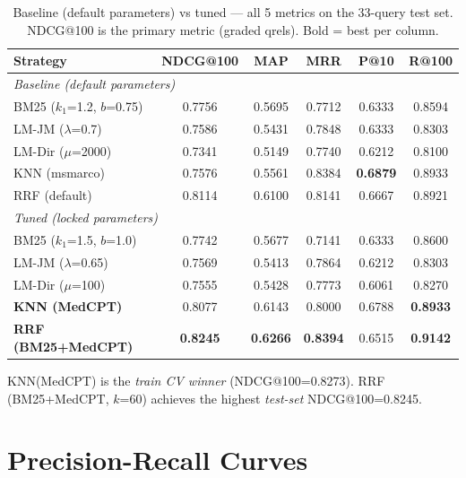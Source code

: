 \begin{table}[H]
\centering
\caption{Baseline (default parameters) vs tuned --- all 5 metrics on the
         33-query test set. NDCG@100 is the primary metric (graded qrels).
         Bold = best per column.}
\label{tab:test_results}
\begin{tabular}{lccccc}
  \hline
  \textbf{Strategy} & \textbf{NDCG@100} & \textbf{MAP} & \textbf{MRR}
                    & \textbf{P@10} & \textbf{R@100} \\
  \hline
  \multicolumn{6}{l}{\textit{Baseline (default parameters)}} \\
  BM25 ($k_1$=1.2, $b$=0.75)   & 0.7756 & 0.5695 & 0.7712 & 0.6333 & 0.8594 \\
  LM-JM ($\lambda$=0.7)         & 0.7586 & 0.5431 & 0.7848 & 0.6333 & 0.8303 \\
  LM-Dir ($\mu$=2000)           & 0.7341 & 0.5149 & 0.7740 & 0.6212 & 0.8100 \\
  KNN (msmarco)                 & 0.7576 & 0.5561 & 0.8384 & \textbf{0.6879} & 0.8933 \\
  RRF (default)                 & 0.8114 & 0.6100 & 0.8141 & 0.6667 & 0.8921 \\
  \hline
  \multicolumn{6}{l}{\textit{Tuned (locked parameters)}} \\
  BM25 ($k_1$=1.5, $b$=1.0)    & 0.7742 & 0.5677 & 0.7141 & 0.6333 & 0.8600 \\
  LM-JM ($\lambda$=0.65)        & 0.7569 & 0.5413 & 0.7864 & 0.6212 & 0.8303 \\
  LM-Dir ($\mu$=100)            & 0.7555 & 0.5428 & 0.7773 & 0.6061 & 0.8270 \\
  \textbf{KNN (MedCPT)}         & 0.8077 & 0.6143 & 0.8000 & 0.6788 & \textbf{0.8933} \\
  \textbf{RRF (BM25+MedCPT)}   & \textbf{0.8245} & \textbf{0.6266}
                                & \textbf{0.8394} & 0.6515 & \textbf{0.9142} \\
  \hline
\end{tabular}
\smallskip\par\noindent\small
KNN(MedCPT) is the \emph{train CV winner} (NDCG@100=0.8273).
RRF (BM25+MedCPT, $k$=60) achieves the highest \emph{test-set} NDCG@100=0.8245.
\end{table}

\section{Precision-Recall Curves}
\label{app:pr_curves}

